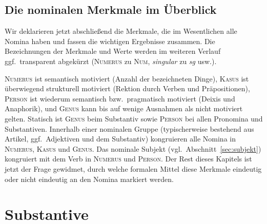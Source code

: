 \Stretch[0.5]

\subsection{Die nominalen Merkmale im Überblick}

Wir deklarieren jetzt abschließend die Merkmale, die im Wesentlichen alle Nomina haben und fassen die wichtigen Ergebnisse zusammen.
Die Bezeichnungen der Merkmale und Werte werden im weiteren Verlauf ggf.\ transparent abgekürzt (\textsc{Numerus} zu \textsc{Num}, \textit{singular} zu \textit{sg} usw.).

\begin{exe}
\end{exe}

\textsc{Numerus} ist semantisch motiviert (Anzahl der bezeichneten Dinge), \textsc{Kasus} ist überwiegend strukturell motiviert (Rektion durch Verben und Präpositionen), \textsc{Person} ist wiederum semantisch bzw.\ pragmatisch motiviert (Deixis und Anaphorik), und \textsc{Genus} kann bis auf wenige Ausnahmen als nicht motiviert gelten.
Statisch ist \textsc{Genus} beim Substantiv sowie \textsc{Person} bei allen Pronomina und Substantiven.
Innerhalb einer nominalen Gruppe (typischerweise bestehend aus Artikel, ggf.\ Adjektiven und dem Substantiv) kongruieren alle Nomina in \textsc{Numerus}, \textsc{Kasus} und \textsc{Genus}.
Das nominale Subjekt (vgl.\ Abschnitt~\ref{sec:subjekt}) kongruiert mit dem Verb in \textsc{Numerus} und \textsc{Person}.
Der Rest dieses Kapitels ist jetzt der Frage gewidmet, durch welche formalen Mittel diese Merkmale eindeutig oder nicht eindeutig an den Nomina markiert werden.




\section{Substantive}

